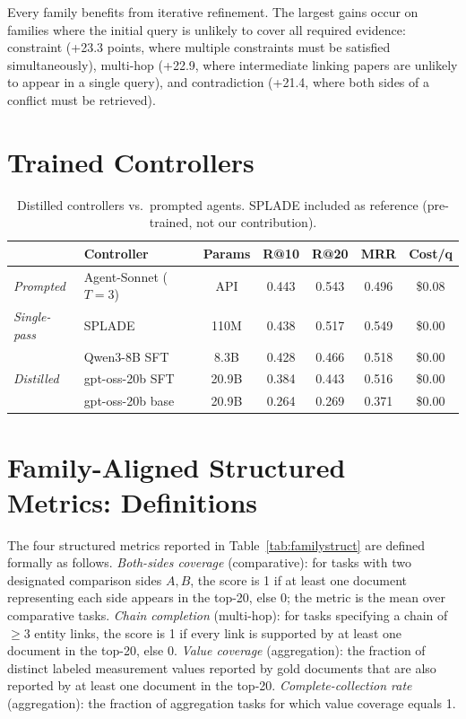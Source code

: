 \documentclass{article}
\begin{document}
Every family benefits from iterative refinement. The largest gains occur on families where the initial query is unlikely to cover all required evidence: constraint (+23.3 points, where multiple constraints must be satisfied simultaneously), multi-hop (+22.9, where intermediate linking papers are unlikely to appear in a single query), and contradiction (+21.4, where both sides of a conflict must be retrieved).

\section{Trained Controllers}
\label{app:trained}

\begin{table}[h]
\centering
\caption{Distilled controllers vs.\ prompted agents. SPLADE included as reference (pre-trained, not our contribution).}
\small
\begin{tabular}{llccccc}
\toprule
& \textbf{Controller} & \textbf{Params} & \textbf{R@10} & \textbf{R@20} & \textbf{MRR} & \textbf{Cost/q} \\
\midrule
\emph{Prompted} & Agent-Sonnet ($T{=}3$) & API & 0.443 & 0.543 & 0.496 & \$0.08 \\
\emph{Single-pass} & SPLADE & 110M & 0.438 & 0.517 & 0.549 & \$0.00 \\
\midrule
\multirow{3}{*}{\emph{Distilled}} & Qwen3-8B SFT & 8.3B & 0.428 & 0.466 & 0.518 & \$0.00 \\
& gpt-oss-20b SFT & 20.9B & 0.384 & 0.443 & 0.516 & \$0.00 \\
& gpt-oss-20b base & 20.9B & 0.264 & 0.269 & 0.371 & \$0.00 \\
\bottomrule
\end{tabular}
\end{table}

\section{Family-Aligned Structured Metrics: Definitions}
\label{app:familymetrics}

The four structured metrics reported in Table~\ref{tab:familystruct} are defined formally as follows. \emph{Both-sides coverage} (comparative): for tasks with two designated comparison sides $A,B$, the score is 1 if at least one document representing each side appears in the top-20, else 0; the metric is the mean over comparative tasks. \emph{Chain completion} (multi-hop): for tasks specifying a chain of $\geq 3$ entity links, the score is 1 if every link is supported by at least one document in the top-20, else 0. \emph{Value coverage} (aggregation): the fraction of distinct labeled measurement values reported by gold documents that are also reported by at least one document in the top-20. \emph{Complete-collection rate} (aggregation): the fraction of aggregation tasks for which value coverage equals 1.
\end{document}
